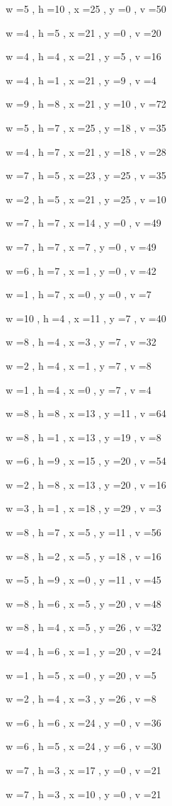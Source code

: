 \documentclass[11pt]{article}
\begin{document}
w =5 , h =10 , x =25 , y =0 , v =50
\par
w =4 , h =5 , x =21 , y =0 , v =20
\par
w =4 , h =4 , x =21 , y =5 , v =16
\par
w =4 , h =1 , x =21 , y =9 , v =4
\par
w =9 , h =8 , x =21 , y =10 , v =72
\par
w =5 , h =7 , x =25 , y =18 , v =35
\par
w =4 , h =7 , x =21 , y =18 , v =28
\par
w =7 , h =5 , x =23 , y =25 , v =35
\par
w =2 , h =5 , x =21 , y =25 , v =10
\par
w =7 , h =7 , x =14 , y =0 , v =49
\par
w =7 , h =7 , x =7 , y =0 , v =49
\par
w =6 , h =7 , x =1 , y =0 , v =42
\par
w =1 , h =7 , x =0 , y =0 , v =7
\par
w =10 , h =4 , x =11 , y =7 , v =40
\par
w =8 , h =4 , x =3 , y =7 , v =32
\par
w =2 , h =4 , x =1 , y =7 , v =8
\par
w =1 , h =4 , x =0 , y =7 , v =4
\par
w =8 , h =8 , x =13 , y =11 , v =64
\par
w =8 , h =1 , x =13 , y =19 , v =8
\par
w =6 , h =9 , x =15 , y =20 , v =54
\par
w =2 , h =8 , x =13 , y =20 , v =16
\par
w =3 , h =1 , x =18 , y =29 , v =3
\par
w =8 , h =7 , x =5 , y =11 , v =56
\par
w =8 , h =2 , x =5 , y =18 , v =16
\par
w =5 , h =9 , x =0 , y =11 , v =45
\par
w =8 , h =6 , x =5 , y =20 , v =48
\par
w =8 , h =4 , x =5 , y =26 , v =32
\par
w =4 , h =6 , x =1 , y =20 , v =24
\par
w =1 , h =5 , x =0 , y =20 , v =5
\par
w =2 , h =4 , x =3 , y =26 , v =8
\par
\newpage




w =6 , h =6 , x =24 , y =0 , v =36
\par
w =6 , h =5 , x =24 , y =6 , v =30
\par
w =7 , h =3 , x =17 , y =0 , v =21
\par
w =7 , h =3 , x =10 , y =0 , v =21
\par
\newpage
\end{document}

